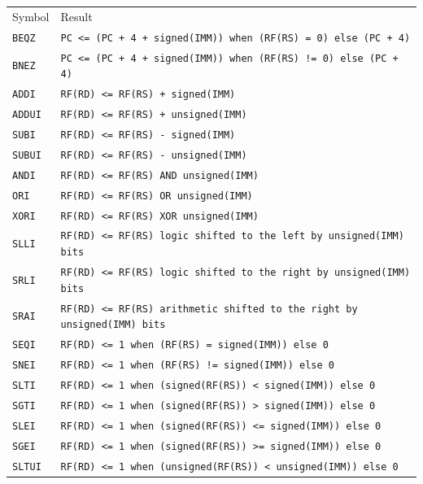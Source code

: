 \begin{table}[ht]
	\centering
	\begin{tabular}{ll}
		\hline
		\rowcolor{gray!50}
		Symbol & Result \\
		\texttt{BEQZ} & \texttt{PC <= (PC + 4 + signed(IMM)) when (RF(RS) = 0) else (PC + 4)} \\
		\rowcolor{gray!25}
		\texttt{BNEZ} & \texttt{PC <= (PC + 4 + signed(IMM)) when (RF(RS) != 0) else (PC + 4)} \\
		\texttt{ADDI} & \texttt{RF(RD) <= RF(RS) + signed(IMM)} \\
		\rowcolor{gray!25}
		\texttt{ADDUI} & \texttt{RF(RD) <= RF(RS) + unsigned(IMM)} \\
		\texttt{SUBI} & \texttt{RF(RD) <= RF(RS) - signed(IMM)} \\
		\rowcolor{gray!25}
		\texttt{SUBUI} & \texttt{RF(RD) <= RF(RS) - unsigned(IMM)} \\
		\texttt{ANDI} & \texttt{RF(RD) <= RF(RS) AND unsigned(IMM)} \\
		\rowcolor{gray!25}
		\texttt{ORI} & \texttt{RF(RD) <= RF(RS) OR unsigned(IMM)} \\
		\texttt{XORI} & \texttt{RF(RD) <= RF(RS) XOR unsigned(IMM)} \\
		\rowcolor{gray!25}
		\texttt{SLLI} & \texttt{RF(RD) <= RF(RS) logic shifted to the left by unsigned(IMM) bits} \\
		\texttt{SRLI} & \texttt{RF(RD) <= RF(RS) logic shifted to the right by unsigned(IMM) bits} \\
		\rowcolor{gray!25}
		\texttt{SRAI} & \texttt{RF(RD) <= RF(RS) arithmetic shifted to the right by unsigned(IMM) bits} \\
		\texttt{SEQI} & \texttt{RF(RD) <= 1 when (RF(RS) = signed(IMM)) else 0} \\
		\rowcolor{gray!25}
		\texttt{SNEI} & \texttt{RF(RD) <= 1 when (RF(RS) != signed(IMM)) else 0} \\
		\texttt{SLTI} & \texttt{RF(RD) <= 1 when (signed(RF(RS)) < signed(IMM)) else 0} \\
		\rowcolor{gray!25}
		\texttt{SGTI} & \texttt{RF(RD) <= 1 when (signed(RF(RS)) > signed(IMM)) else 0} \\
		\texttt{SLEI} & \texttt{RF(RD) <= 1 when (signed(RF(RS)) <= signed(IMM)) else 0} \\
		\rowcolor{gray!25}
		\texttt{SGEI} & \texttt{RF(RD) <= 1 when (signed(RF(RS)) >= signed(IMM)) else 0} \\
		\texttt{SLTUI} & \texttt{RF(RD) <= 1 when (unsigned(RF(RS)) < unsigned(IMM)) else 0} \\

\end{tabular}
\end{table}
